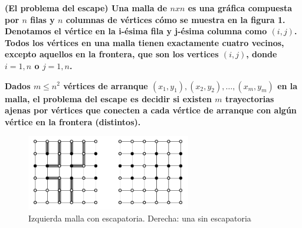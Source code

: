 \textbf{
    (El problema del escape) Una malla de $n x n$ es una gráfica compuesta por $n$ filas y
    $n$  columnas de vértices cómo se muestra en la figura 1. Denotamos el vértice en la 
    i-ésima fila y j-ésima columna como $(i, j)$. Todos los vértices en una malla tienen 
    exactamente cuatro vecinos, excepto aquellos en la frontera, que son los vertices 
    $(i,j)$, donde $i = 1, n$ o $j = 1, n$.
}

\textbf{
    Dados $m \leq n^2$ vértices de arranque $(x_1,y_1),(x_2,y_2), \dots ,(x_m,y_m)$ en la 
    malla, el problema del escape es decidir si existen $m$ trayectorias ajenas por vértices
    que conecten a cada vértice de arranque con algún vértice en la frontera (distintos).
}\vspace{.2cm}

\begin{figure}[H]
    \centering
        \includegraphics[height=3.3cm]{src/Img/8.png}
        \caption{Izquierda malla con escapatoria. Derecha: una sin escapatoria}
\end{figure}
